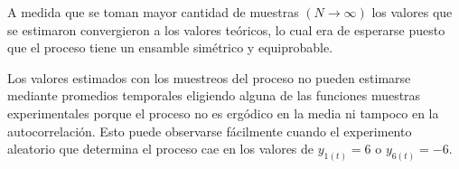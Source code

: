 A medida que se toman mayor cantidad de muestras $(N \rightarrow \infty )$ los valores que se estimaron convergieron a los valores teóricos, lo cual era de esperarse puesto que el proceso tiene un ensamble simétrico y equiprobable. 

Los valores estimados con los muestreos del proceso no pueden estimarse mediante promedios temporales eligiendo alguna de las funciones muestras experimentales porque el proceso no es ergódico en la media ni tampoco en la autocorrelación. Esto puede observarse fácilmente cuando el experimento aleatorio que determina el proceso cae en los valores de $y_{1(t)} = 6$ o $y_{6(t)} = -6$.

%

